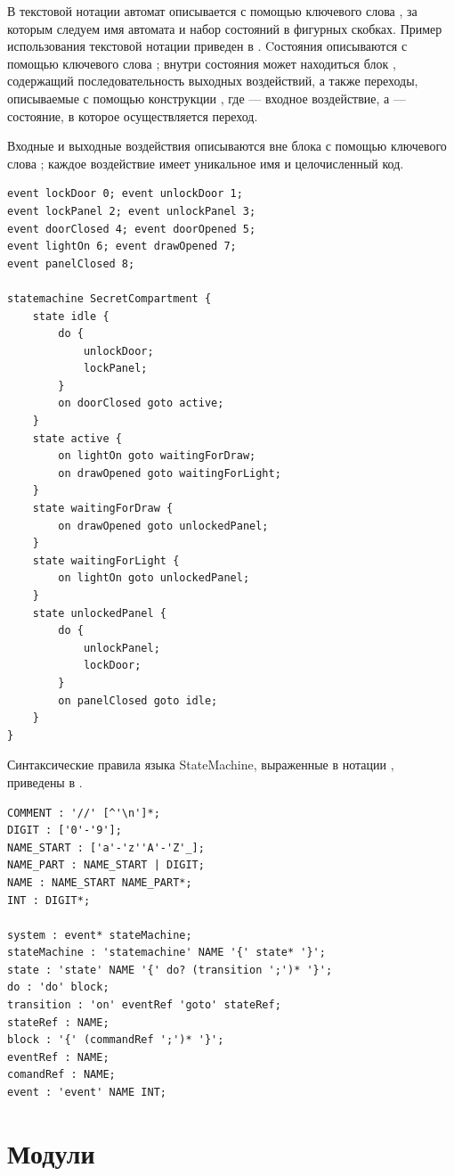 В текстовой нотации автомат описывается с помощью ключевого слова , за которым следуем имя автомата и набор состояний в фигурных скобках. Пример использования текстовой нотации приведен в . Cостояния описываются с помощью ключевого слова ; внутри состояния может находиться блок , содержащий последовательность выходных воздействий, а также переходы, описываемые с помощью конструкции , где  --- входное воздействие, а  --- состояние, в которое осуществляется переход.

Входные и выходные воздействия описываются вне блока  с помощью ключевого слова ; каждое воздействие имеет уникальное имя и целочисленный код.

\begin{lstlisting}[label=SMText,float=htbp,caption=Текстовая нотация языка StateMachine]
event lockDoor 0; event unlockDoor 1;
event lockPanel 2; event unlockPanel 3;
event doorClosed 4; event doorOpened 5;
event lightOn 6; event drawOpened 7;
event panelClosed 8;

statemachine SecretCompartment {
	state idle {
		do {
			unlockDoor;
			lockPanel;
		}
		on doorClosed goto active;
	}
	state active {
		on lightOn goto waitingForDraw;
		on drawOpened goto waitingForLight;
	}
	state waitingForDraw {
		on drawOpened goto unlockedPanel;
	}
	state waitingForLight {
		on lightOn goto unlockedPanel;
	}
	state unlockedPanel {
		do {
			unlockPanel;
			lockDoor;
		}
		on panelClosed goto idle;
	}
}
\end{lstlisting}

Синтаксические правила языка StateMachine, выраженные в нотации , приведены в .

\begin{lstlisting}[xleftmargin=1cm,label=SMGram,caption=Грамматика языка StateMachine]
COMMENT : '//' [^'\n']*;
DIGIT : ['0'-'9'];
NAME_START : ['a'-'z''A'-'Z'_];
NAME_PART : NAME_START | DIGIT;
NAME : NAME_START NAME_PART*;
INT : DIGIT*;

system : event* stateMachine;
stateMachine : 'statemachine' NAME '{' state* '}';
state : 'state' NAME '{' do? (transition ';')* '}';
do : 'do' block;
transition : 'on' eventRef 'goto' stateRef;
stateRef : NAME;
block : '{' (commandRef ';')* '}';
eventRef : NAME;
comandRef : NAME;
event : 'event' NAME INT;
\end{lstlisting}

\chapter{Модули}


